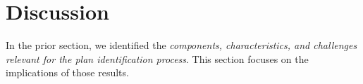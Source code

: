 \section{Discussion}



In the prior section, we identified the \textit{components, characteristics, and challenges relevant for the plan identification process}. 
This section focuses on the implications of those results.














